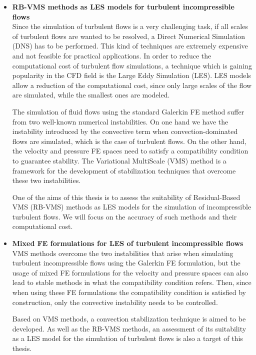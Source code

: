 \begin{itemize}
\item {\bf RB-VMS methods as LES models for turbulent incompressible flows}\\
Since the simulation of turbulent flows is a very challenging task, if all scales of turbulent flows are wanted to be resolved, a Direct Numerical Simulation (DNS) has to be performed. This kind of techniques are extremely expensive and not feasible for practical applications. In order to reduce the computational cost of turbulent flow simulations, a technique which is gaining popularity in the CFD field is the Large Eddy Simulation (LES). LES models allow a reduction of the computational cost, since only large scales of the flow are simulated, while the smallest ones are modeled.

The simulation of fluid flows using the standard Galerkin FE method suffer from two well-known numerical instabilities. On one hand we have the instability introduced by the convective term when convection-dominated flows are simulated, which is the case of turbulent flows. On the other hand, the velocity and pressure FE spaces need to satisfy a compatibility condition to guarantee stability. The Variational MultiScale (VMS) method is a framework for the development of stabilization techniques that overcome these two instabilities. 

One of the aims of this thesis is to assess the suitability of Residual-Based VMS (RB-VMS) methods as LES models for the simulation of incompressible turbulent flows. We will focus on the accuracy of such methods and their computational cost.

\item {\bf Mixed FE formulations for LES of turbulent incompressible flows}\\
VMS methods overcome the two instabilities that arise when simulating turbulent incompressible flows using the Galerkin FE formulation, but the usage of mixed FE formulations for the velocity and pressure spaces can also lead to stable methods in what the compatibility condition refers. Then, since when using these FE formulations the compatibility condition is satisfied by construction, only the convective instability needs to be controlled.

Based on VMS methods, a convection stabilization technique is aimed to be developed. As well as the RB-VMS methods, an assessment of its suitability as a LES model for the simulation of turbulent flows is also a target of this thesis.


\end{itemize}
